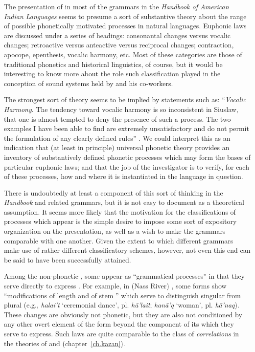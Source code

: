 The presentation of  in most of the grammars in the
\textsl{Handbook of American Indian Languages} seems to presume a sort
of substantive theory about the range of possible phonetically
motivated processes in natural languages. Euphonic laws are discussed
under a series of headings: consonantal changes versus vocalic
changes; retroactive versus anteactive versus reciprocal changes;
contraction, apocope, epenthesis, vocalic harmony, etc. Most of these
categories are those of traditional phonetics and historical
linguistics, of course, but it would be interesting to know more about
the role such classification played in the conception of sound systems
held by {\Boas} and his co-workers.

\largerpage
The strongest sort of theory seems to be implied by statements such
as: ``\emph{Vocalic Harmony}. The tendency toward vocalic harmony is
so inconsistent in Siuslaw, that one is almost tempted to deny the
presence of such a process. The two examples I have been able to find
are extremely unsatisfactory and do not permit the formulation of any
clearly defined rules'' \citep[452]{frachtenburg22:siuslawan}. We could
interpret this as an indication that (at least in principle) universal
phonetic theory provides an inventory of substantively defined
phonetic processes which may form the bases of particular euphonic
laws; and that the job of the investigator is to verify, for each of
these processes, how and where it is instantiated in the language in
question.

There is undoubtedly at least a component of this sort of thinking in
the \textsl{Handbook} and related grammars, but it is not easy to
document as a theoretical assumption. It seems more likely that the
motivation for the classifications of processes which appear is the
simple desire to impose some sort of expository organization on the
presentation, as well as a wish to make the grammars comparable with
one another. Given the extent to which different grammars make use of
rather different classificatory schemes, however, not even this end
can be said to have been successfully attained.

Among the non-phonetic , some appear as ``grammatical
processes'' in that they serve directly to express . For
example, in (Nass River)  \citep[373]{boas11:tsimshian}, some forms
show ``modifications of length and  of stem '' which
serve to distinguish singular from plural (e.g., \emph{halai't}
`ceremonial dance', pl. \emph{hā'lait}; \emph{hanā'q} `woman',
pl. \emph{hā'naq}). These changes are obviously not phonetic, but they
are also not conditioned by any other overt element of the form beyond
the component of its  which they serve to express. Such laws
are quite comparable to the class of \emph{correlations} in the
theories of {\Kruszewski} and {\DeCourtenay}
(chapter~\ref{ch.kazan}).

